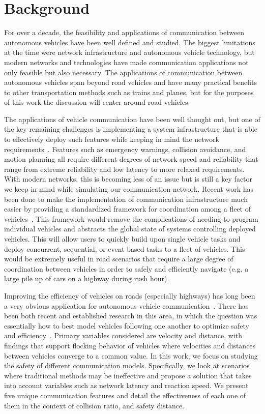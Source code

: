 \section{Background}

For over a decade, the feasibility and applications of communication between autonomous
vehicles have been well defined and studied. The biggest limitations at the time were
network infrastructure and autonomous vehicle technology, but modern networks and technologies
have made communication applications not only feasible but also necessary. 
The applications of communication between autonomous vehicles
span beyond road vehicles and have many practical benefits to other transportation methods
such as trains and planes, but for the purposes of this work the discussion will center
around road vehicles.

The applications of vehicle communication have been well thought out, but one of the key remaining
challenges is implementing a system infrastructure that is able to
effectively deploy such features while keeping in mind the network requirements~\cite{willke2009survey}.
Features such as emergency warnings, collision avoidance, and motion planning
all require different degrees of network speed and reliability that range from
extreme reliability and low latency to more relaxed requirements. With modern networks,
this is becoming less of an issue but is still a key factor we keep in mind while
simulating our communication network.
Recent work has been done to make
the implementation of communication infrastructure much easier by providing a standardized
framework for coordination among a fleet of vehicles~\cite{keila2018}.
This framework would remove
the complications of needing to program individual vehicles and abstracts the global
state of systems controlling deployed vehicles. This will allow users to quickly build
upon single vehicle tasks and deploy concurrent, sequential, or event based tasks
to a fleet of vehicles. This would be extremely useful in road scenarios that require
a large degree of coordination between vehicles in order to safely and efficiently
navigate (e.g. a large pile up of cars on a highway during rush hour).

Improving the efficiency of vehicles on roads (especially highways) has long been a
very obvious application for autonomous vehicle communication~\cite{murray2007recent}.
There has been both recent and established research in this area, in which the question
was essentially how to best model vehicles following one another to
optimize safety and efficiency~\cite{ou2017extended, tanner2003coordination}.
Primary variables considered are velocity
and distance, with findings that support flocking behavior of vehicles where velocities
and distances between vehicles converge to a common value.
In this work, we focus on studying the safety of different communication models.
Specifically, we look at scenarios where traditional methods may be ineffective and propose
a solution that takes into account variables such as network latency and reaction speed.
We present five unique communication features and detail the effectiveness of each one of them
in the context of collision ratio, and safety distance.